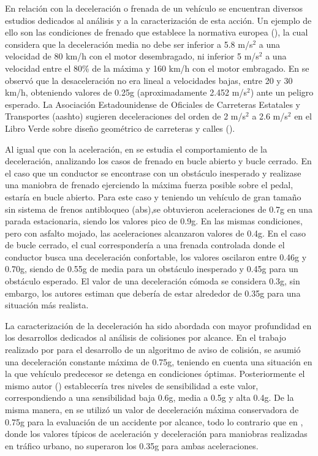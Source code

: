 En relación con la deceleración o frenada de un vehículo se encuentran diversos estudios dedicados al análisis y a la caracterización de esta acción. Un ejemplo de ello son las condiciones de frenado que establece la normativa europea (\cite{frenado}), la cual considera que la deceleración media no debe ser inferior a 5.8 m/s$^2$ a una velocidad de 80 km/h con el motor desembragado, ni inferior 5 m/s$^2$ a una velocidad entre el 80\% de la máxima y 160 km/h con el motor embragado. En \textcite{roenitz} se observó que la desaceleración no era lineal a velocidades bajas, entre 20 y 30 km/h, obteniendo valores de 0.25g (aproximadamente 2.452 m/s$^2$) ante un peligro esperado. La Asociación Estadounidense de Oficiales de Carreteras Estatales y Transportes (\gls{aashto}) sugieren deceleraciones del orden de 2 m/s$^2$ a 2.6 m/s$^2$ en el Libro Verde sobre diseño geométrico de carreteras y calles (\cite{AASHTO}).

Al igual que con la aceleración, en \textcite{gartner} se estudia el comportamiento de la deceleración, analizando los casos de frenado en bucle abierto y bucle cerrado. En el caso que un conductor se encontrase con un obstáculo inesperado y realizase una maniobra de frenado ejerciendo la máxima fuerza posible sobre el pedal, estaría en bucle abierto. Para este caso y teniendo un vehículo de gran tamaño sin sistema de frenos antibloqueo (\gls{abs}),se obtuvieron aceleraciones de 0.7g en una parada estacionaria, siendo los valores pico de 0.9g. En las mismas condiciones, pero con asfalto mojado, las aceleraciones alcanzaron valores de 0.4g. En el caso de bucle cerrado, el cual correspondería a una frenada controlada donde el conductor busca una deceleración confortable, los valores oscilaron entre 0.46g y 0.70g, siendo de 0.55g de media para un obstáculo inesperado y 0.45g para un obstáculo esperado. El valor de una deceleración cómoda se considera 0.3g, sin embargo, los autores estiman que debería de estar alrededor de 0.35g para una situación más realista. 

La caracterización de la deceleración ha sido abordada con mayor profundidad en los desarrollos dedicados al análisis de colisiones por alcance. En el trabajo realizado por \textcite{burgett98} para el desarrollo de un algoritmo de aviso de colisión, se asumió una deceleración constante máxima de 0.75g, teniendo en cuenta una situación en la que vehículo predecesor se detenga en condiciones óptimas. Posteriormente el mismo autor (\cite{burgett01}) establecería tres niveles de sensibilidad a este valor, correspondiendo a una sensibilidad baja 0.6g, media a 0.5g y alta 0.4g. De la misma manera, en \textcite{wilson} se utilizó un valor de deceleración máxima conservadora de 0.75g para la evaluación de un accidente por alcance, todo lo contrario que en \textcite{weaver11}, donde los valores típicos de aceleración y deceleración para maniobras realizadas en tráfico urbano, no superaron los 0.35g para ambas aceleraciones.

